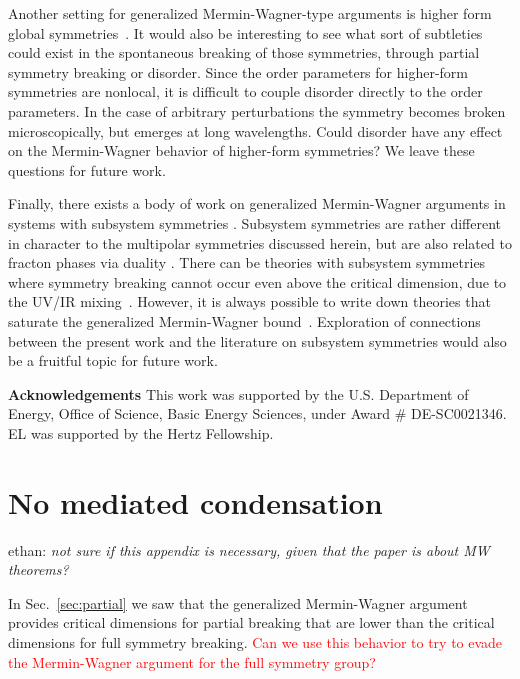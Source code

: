 \documentclass[pra,aps,twocolumn, amsfonts,amsmath,amssymb,nofootinbib,superscriptaddress]{revtex4-2}
\newcommand{\note}[1]{\textcolor{red}{#1}}
\newcommand{\ethan}[1]{ { \color{blue} \footnotesize \textsf{ethan: \textsl{#1}} }}
\begin{document}
Another setting for generalized Mermin-Wagner-type arguments is higher form global symmetries~\cite{GKSW, Lake, Marvin}. It would also be interesting to see what sort of subtleties could exist in the spontaneous breaking of those symmetries, through partial symmetry breaking or disorder. Since the order parameters for higher-form symmetries are nonlocal, it is difficult to couple disorder directly to the order parameters. In the case of arbitrary perturbations the symmetry becomes broken microscopically, but emerges at long wavelengths. Could disorder have any effect on the Mermin-Wagner behavior of higher-form symmetries? We leave these questions for future work. 

Finally, there exists a body of work on generalized Mermin-Wagner arguments in systems with subsystem symmetries \cite{Batista2005, SeibergA, SeibergB, SeibergC, Gorantla2021, Distler2021}. Subsystem symmetries are rather different in character to the multipolar symmetries discussed herein, but are also related to fracton phases via duality \cite{VHF2}. There can be theories with subsystem symmetries where symmetry breaking cannot occur even above the critical dimension, due to the UV/IR mixing~\cite{Gorantla2021}. However, it is always possible to write down theories that saturate the generalized Mermin-Wagner bound~\cite{Distler2021}.
Exploration of connections between the present work and the literature on subsystem symmetries would also be a fruitful topic for future work. 

{\bf Acknowledgements} This work was supported by
the U.S. Department of Energy, Office of Science, Basic
Energy Sciences, under Award \# DE-SC0021346. EL was supported by the Hertz Fellowship. 




\appendix

\section{No mediated condensation} \label{app:mediated}

\ethan{not sure if this appendix is necessary, given that the paper is about MW theorems?} 

In Sec.~\ref{sec:partial} we saw that the generalized Mermin-Wagner argument provides critical dimensions for partial breaking that are lower than the critical dimensions for full symmetry breaking. \note{Can we use this behavior to try to evade the Mermin-Wagner argument for the full symmetry group?}
\end{document}
